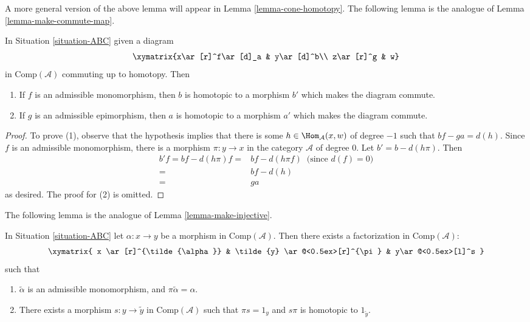 \noindent
A more general version of the above lemma will appear in
Lemma \ref{lemma-cone-homotopy}. The following lemma is the
analogue of Lemma \ref{lemma-make-commute-map}.

\begin{lemma}
\label{lemma-homo-change}
In Situation \ref{situation-ABC} given a diagram
$$
\xymatrix{x\ar[r]^f\ar[d]_a & y\ar[d]^b\\
z\ar[r]^g & w}
$$
in $\text{Comp}(\mathcal{A})$ commuting up to homotopy. Then
\begin{enumerate}
\item If $f$ is an admissible monomorphism, then $b$ is homotopic
to a morphism $b'$ which makes the diagram commute.
\item If $g$ is an admissible epimorphism, then $a$ is homotopic
to a morphism $a'$ which makes the diagram commute.
\end{enumerate}
\end{lemma}

\begin{proof}
To prove (1), observe that the hypothesis implies that there is some
$h\in\Hom_{\mathcal{A}}(x,w)$ of degree $-1$ such that $bf-ga=d(h)$.
Since $f$ is an admissible monomorphism, there is a morphism
$\pi:y\to x$ in the category $\mathcal{A}$ of degree $0$.
Let $b'=b-d(h\pi)$. Then
\begin{align*}
b'f = bf-d(h\pi)f = &
bf-d(h\pi f)\;\;\text{(since $d(f)=0$)} \\
= &
bf-d(h) \\
= &
ga
\end{align*}
as desired. The proof for (2) is omitted.
\end{proof}

\noindent
The following lemma is the analogue of Lemma \ref{lemma-make-injective}.

\begin{lemma}
\label{lemma-factor}
In Situation \ref{situation-ABC} let $\alpha:x\to y$
be a morphism in $\text{Comp}(\mathcal{A})$. Then there exists
a factorization in $\text{Comp}(\mathcal{A})$:
$$
\xymatrix{
x \ar[r]^{\tilde{\alpha}}  &
\tilde{y} \ar@<0.5ex>[r]^{\pi} &
y\ar@<0.5ex>[l]^s
}
$$
such that
\begin{enumerate}
\item $\tilde{\alpha}$ is an admissible monomorphism, and
$\pi\tilde{\alpha}=\alpha$.
\item There exists a morphism
$s:y\to\tilde{y}$ in $\text{Comp}(\mathcal{A})$
such that $\pi s=1_y$ and $s\pi$ is homotopic to $1_{\tilde{y}}$. 
\end{enumerate}
\end{lemma}

